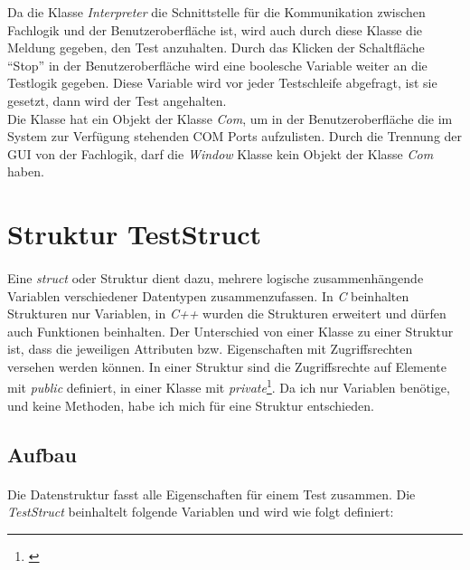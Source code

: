 Da die Klasse \textit{Interpreter} die Schnittstelle für die Kommunikation zwischen Fachlogik und der Benutzeroberfläche ist, wird auch durch diese Klasse die Meldung gegeben, den Test anzuhalten. Durch das Klicken der Schaltfläche "`Stop"' in der Benutzeroberfläche wird eine boolesche Variable weiter an die Testlogik gegeben. Diese Variable wird vor jeder Testschleife abgefragt, ist sie gesetzt, dann wird der Test angehalten.\\

Die Klasse hat ein Objekt der Klasse \textit{Com}, um in der Benutzeroberfläche die im System zur Verfügung stehenden COM Ports aufzulisten. Durch die Trennung der GUI von der Fachlogik, darf die \textit{Window} Klasse kein Objekt der Klasse \textit{Com} haben.\\



\newpage

\section{Struktur TestStruct}\label{TestStruct}
\paragraph{}
Eine \textit{struct} oder Struktur dient dazu, mehrere logische zusammenhängende Variablen verschiedener Datentypen zusammenzufassen. In \textit{C} beinhalten Strukturen nur Variablen, in \textit{C++} wurden die Strukturen erweitert und dürfen auch Funktionen beinhalten. Der Unterschied von einer Klasse zu einer Struktur ist, dass die jeweiligen Attributen bzw. Eigenschaften mit Zugriffsrechten versehen werden können. In einer Struktur sind die Zugriffsrechte auf Elemente mit  \textit{public} definiert, in einer Klasse mit \textit{private}\footnote{\cite{VisualC++}}. Da ich nur Variablen benötige, und keine Methoden, habe ich mich für eine Struktur entschieden.


\subsection{Aufbau}
\paragraph{}
Die Datenstruktur fasst alle Eigenschaften für einem Test zusammen. Die \textit{TestStruct} beinhaltelt folgende Variablen und wird wie folgt definiert:\\

